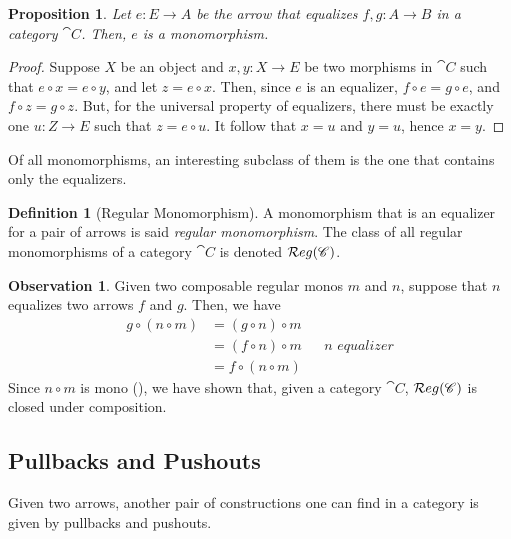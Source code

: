 \documentclass[a4paper, twoside,openright]{report}
\theoremstyle{plain}
\newtheorem{prop}[theorem]{Proposition}
\theoremstyle{definition}
\newtheorem{definition}[theorem]{Definition}
\newtheorem{obs}[theorem]{Observation}
\begin{document}
\begin{prop}\label{prop:eq_are_mono}
    Let $e: E \rightarrow A$ be the arrow that equalizes $f, g : A \rightarrow B$ in a category $\cat C$. Then, $e$ is a monomorphism.
\end{prop}

\begin{proof}
    Suppose $X$ be an object and $x, y: X \rightarrow E$ be two morphisms in $\cat C$ such that $e \circ x = e \circ y$, and let $z = e \circ x$. Then, since $e$ is an equalizer, $f \circ e = g \circ e$, and $f \circ z = g \circ z$. But, for the universal property of equalizers, there must be exactly one $u: Z \rightarrow E$ such that $z = e \circ u$. It follow that $x = u$ and $y = u$, hence $x = y$.
\end{proof}

Of all monomorphisms, an interesting subclass of them is the one that contains only the equalizers.

\begin{definition}[Regular Monomorphism]\label{def:reg_mono}
    A monomorphism that is an equalizer for a pair of arrows is said \emph{regular monomorphism}. The class of all regular monomorphisms of a category $\cat C$ is denoted $\mathcal{R}eg(\mathscr{C})$.
\end{definition}

\begin{obs}
    Given two composable regular monos $m$ and $n$, suppose that $n$ equalizes two arrows $f$ and $g$. Then, we have
    \begin{align*}
        g \circ (n \circ m) &= (g \circ n) \circ m &&\\
                            &= (f \circ n) \circ m  && \textit{$n$ equalizer} \\
                            &= f \circ (n \circ m)
    \end{align*}
    Since $n \circ m$ is mono (), we have shown that, given a category $\cat C$, $\mathcal{R}eg(\mathscr{C})$ is closed under composition. 
\end{obs}

\subsection{Pullbacks and Pushouts}

Given two arrows, another pair of constructions one can find in a category is given by pullbacks and pushouts.
\end{document}
